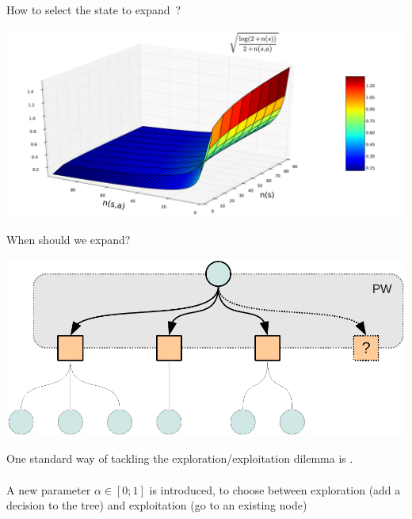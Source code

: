 \begin{frame}{How to select the state to expand~?}
    \begin{center}
        \includegraphics[width=.90\linewidth]{figs/ucb_func2}
    \end{center}
\end{frame}


\begin{frame}{When should we expand?}
    \begin{center}
        \includegraphics[width=.40\linewidth]{figs/tree5}
    \end{center}

    One standard way of tackling the exploration/exploitation dilemma
    is \pw.\\
    ~\\
    A new parameter $\alpha \in [0 ; 1]$ is introduced, to choose between exploration (add a decision to
    the tree) and exploitation (go to an existing node)
\end{frame}


